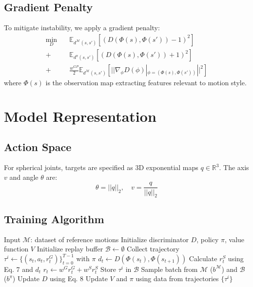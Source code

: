 \documentclass[acmtog]{acmart}
\begin{document}
\subsection{Gradient Penalty}
To mitigate instability, we apply a gradient penalty:
\begin{equation}
\begin{split}
    \min_{D} \quad & \mathbb{E}_{d^{\mathcal{M}}(s,s')} [(D(\Phi(s),\Phi(s')) - 1)^2] \\
    + & \mathbb{E}_{d^{\pi}(s,s')} [(D(\Phi(s),\Phi(s')) + 1)^2] \\
    + & \frac{w^{GP}}{2} \mathbb{E}_{d^{\mathcal{M}}(s,s')} [||\nabla_{\phi} D(\phi)|_{\phi=(\Phi(s),\Phi(s'))}||^2]
\end{split}
\end{equation}
where $\Phi(s)$ is the observation map extracting features relevant to motion style.

\section{Model Representation}

\subsection{Action Space}
For spherical joints, targets are specified as 3D exponential maps $q \in \mathbb{R}^3$. The axis $v$ and angle $\theta$ are:
\begin{equation}
    \theta = ||q||_2, \quad v = \frac{q}{||q||_2}
\end{equation}

\subsection{Training Algorithm}

\begin{algorithm}
\caption{Training with AMP}
\begin{algorithmic}[1]
\State Input $\mathcal{M}$: dataset of reference motions
\State Initialize discriminator $D$, policy $\pi$, value function $V$
\State Initialize replay buffer $\mathcal{B} \leftarrow \emptyset$
        \State Collect trajectory $\tau^i \leftarrow \{(s_t, a_t, r_t^G)\}_{t=0}^{T-1}$ with $\pi$
            \State $d_t \leftarrow D(\Phi(s_t), \Phi(s_{t+1}))$
            \State Calculate $r_t^S$ using Eq. 7 and $d_t$
            \State $r_t \leftarrow w^G r_t^G + w^S r_t^S$
        \EndFor
        \State Store $\tau^i$ in $\mathcal{B}$
    \EndFor
        \State Sample batch from $\mathcal{M}$ ($b^{\mathcal{M}}$) and $\mathcal{B}$ ($b^{\pi}$)
        \State Update $D$ using Eq. 8
    \EndFor
    \State Update $V$ and $\pi$ using data from trajectories $\{\tau^i\}$
\EndWhile
\end{algorithmic}
\end{algorithm}
\end{document}
